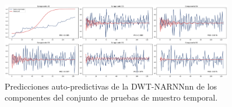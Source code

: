 \begin{figure}[H]
    \centering
    \includegraphics[width=0.9\textwidth]{Figuras/proceso_de_entrenamiento/grafs_c_prueba/DWT_NARNN/auto_predictiva/DWT_NARNN.png}
    \caption{Predicciones auto-predictivas de la DWT-NARNNnn de los componentes del conjunto de pruebas de muestro temporal.} 
    \label{fig:c_prueba_componentes_DWTNARNN_autopred}
\end{figure}

